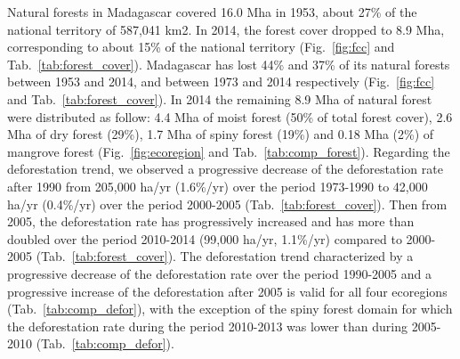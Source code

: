 \documentclass[essd, classical]{copernicus}
\begin{document}
Natural forests in Madagascar covered 16.0 Mha in 1953, about 27\% of
the national territory of 587,041 km2. In 2014, the forest cover
dropped to 8.9 Mha, corresponding to about 15\% of the national
territory (Fig.~\ref{fig:fcc} and
Tab.~\ref{tab:forest_cover}). Madagascar has lost 44\% and 37\% of its
natural forests between 1953 and 2014, and between 1973 and 2014
respectively (Fig.~\ref{fig:fcc} and Tab.~\ref{tab:forest_cover}). In
2014 the remaining 8.9 Mha of natural forest were distributed as follow: 4.4
Mha of moist forest (50\% of total forest cover), 2.6 Mha of dry
forest (29\%), 1.7 Mha of spiny forest (19\%) and 0.18 Mha (2\%) of
mangrove forest (Fig.~\ref{fig:ecoregion} and
Tab.~\ref{tab:comp_forest}). Regarding the deforestation trend, we
observed a progressive decrease of the deforestation rate after 1990
from 205,000 ha/yr (1.6\%/yr) over the period 1973-1990 to 42,000
ha/yr (0.4\%/yr) over the period 2000-2005
(Tab.~\ref{tab:forest_cover}). Then from 2005, the deforestation rate
has progressively increased and has more than doubled over the period
2010-2014 (99,000 ha/yr, 1.1\%/yr) compared to 2000-2005
(Tab.~\ref{tab:forest_cover}). The deforestation trend characterized
by a progressive decrease of the deforestation rate over the period
1990-2005 and a progressive increase of the deforestation after 2005
is valid for all four ecoregions (Tab.~\ref{tab:comp_defor}), with the
exception of the spiny forest domain for which the deforestation rate
during the period 2010-2013 was lower than during 2005-2010
(Tab.~\ref{tab:comp_defor}).
\end{document}

